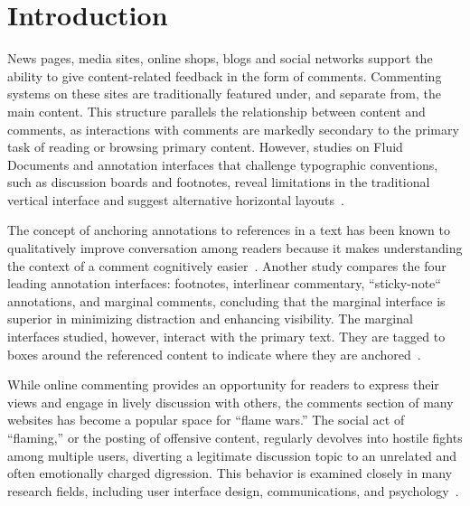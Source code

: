 \section{Introduction}

News pages, media sites, online shops, blogs and social networks support the ability to give content-related feedback in the form of comments. Commenting systems on these sites are traditionally featured under, and separate from, the main content. This structure parallels the relationship between content and comments, as interactions with comments are markedly secondary to the primary task of reading or browsing primary content. However, studies on Fluid Documents and annotation interfaces that challenge typographic conventions, such as discussion boards and footnotes, reveal limitations in the traditional vertical interface and suggest alternative horizontal layouts~\cite{Brush,Guzdial,van,AnnotationsStudents,NewsInterfaces,FluidDocs,NB}. 


The concept of anchoring annotations to references in a text has been known to qualitatively improve conversation among readers because it makes understanding the context of a comment cognitively easier~\cite{Brush,Guzdial,van}. Another study compares the four leading annotation interfaces: footnotes, interlinear commentary, ``sticky-note`` annotations, and marginal comments, concluding that the marginal interface is superior in minimizing distraction and enhancing visibility. The marginal interfaces studied, however, interact with the primary text. They are tagged to boxes around the referenced content to indicate where they are anchored~\cite{AnnotationsStudents}. 


While online commenting provides an opportunity for readers to express their views and engage in lively discussion with others, the comments section of many websites has become a popular space for “flame wars.” The social act of “flaming,” or the posting of offensive content, regularly devolves into hostile fights among multiple users, diverting a legitimate discussion topic to an unrelated and often emotionally charged digression. This behavior is examined closely in many research fields, including user interface design, communications, and psychology~\cite{FlamingPsych,FlamingCommunications,FlamingSoftware,FlamingComp}. 


